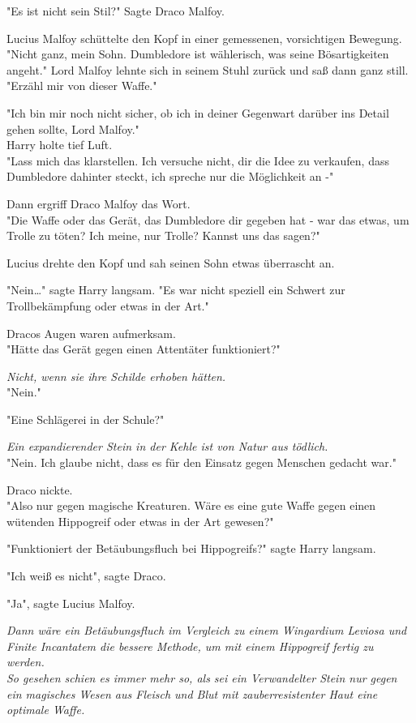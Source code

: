 {"Es ist nicht sein Stil?" Sagte Draco Malfoy.

Lucius Malfoy schüttelte den Kopf in einer gemessenen, vorsichtigen Bewegung. "Nicht ganz, mein Sohn. Dumbledore ist wählerisch, was seine Bösartigkeiten angeht." Lord Malfoy lehnte sich in seinem Stuhl zurück und saß dann ganz still. "Erzähl mir von dieser Waffe."

"Ich bin mir noch nicht sicher, ob ich in deiner Gegenwart darüber ins Detail gehen sollte, Lord Malfoy."\\ Harry holte tief Luft.\\ "Lass mich das klarstellen. Ich versuche nicht, dir die Idee zu verkaufen, dass Dumbledore dahinter steckt, ich spreche nur die Möglichkeit an -"

Dann ergriff Draco Malfoy das Wort.\\ "Die Waffe oder das Gerät, das Dumbledore dir gegeben hat - war das etwas, um Trolle zu töten? Ich meine, nur Trolle? Kannst uns das sagen?"

Lucius drehte den Kopf und sah seinen Sohn etwas überrascht an.

"Nein…" sagte Harry langsam. "Es war nicht speziell ein Schwert zur Trollbekämpfung oder etwas in der Art."

Dracos Augen waren aufmerksam.\\ "Hätte das Gerät gegen einen Attentäter funktioniert?"

\emph{Nicht, wenn sie ihre Schilde erhoben hätten.}\\ "Nein."

"Eine Schlägerei in der Schule?"

\emph{Ein expandierender Stein in der Kehle ist von Natur aus tödlich.}\\ "Nein. Ich glaube nicht, dass es für den Einsatz gegen Menschen gedacht war."

Draco nickte.\\ "Also nur gegen magische Kreaturen. Wäre es eine gute Waffe gegen einen wütenden Hippogreif oder etwas in der Art gewesen?"

"Funktioniert der Betäubungsfluch bei Hippogreifs?" sagte Harry langsam.

"Ich weiß es nicht", sagte Draco.

"Ja", sagte Lucius Malfoy.

\emph{Dann wäre ein Betäubungsfluch im Vergleich zu einem Wingardium Leviosa und Finite Incantatem die bessere Methode, um mit einem Hippogreif fertig zu werden.}\\ \emph{So gesehen schien es immer mehr so, als sei ein Verwandelter Stein nur gegen ein magisches Wesen aus Fleisch und Blut mit zauberresistenter Haut eine optimale Waffe.}

}
